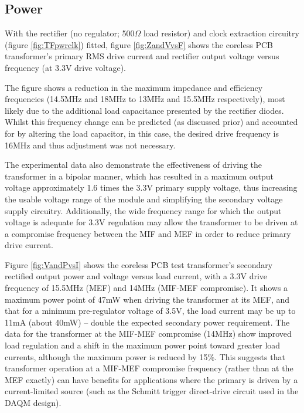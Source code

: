 \documentclass[conference]{IEEEtran}
\begin{document}
	\subsection{Power}
	With the rectifier (no regulator; 500$\Omega$ load resistor) and clock extraction circuitry (figure \ref{fig:TFpwrclk}) fitted, figure \ref{fig:ZandVvsF} shows the coreless PCB transformer's primary RMS drive current and rectifier output voltage versus frequency (at 3.3V drive voltage).
	
	The figure shows a reduction in the maximum impedance and efficiency frequencies (14.5MHz and 18MHz to 13MHz and 15.5MHz respectively), most likely due to the additional load capacitance presented by the rectifier diodes.  Whilst this frequency change can be predicted (as discussed prior) and accounted for by altering the load capacitor, in this case, the desired drive frequency is 16MHz and thus adjustment was not necessary.
	
	The experimental data also demonstrate the effectiveness of driving the transformer in a bipolar manner, which has resulted in a maximum output voltage approximately 1.6 times the 3.3V primary supply voltage, thus increasing the usable voltage range of the module and simplifying the secondary voltage supply circuitry.  Additionally, the wide frequency range for which the output voltage is adequate for 3.3V regulation may allow the transformer to be driven at a compromise frequency between the MIF and MEF in order to reduce primary drive current.
	
	Figure \ref{fig:VandPvsI} shows the coreless PCB test transformer's secondary rectified output power and voltage versus load current, with a 3.3V drive frequency of 15.5MHz (MEF) and 14MHz (MIF-MEF compromise).  It shows a maximum power point of 47mW when driving the transformer at its MEF, and that for a minimum pre-regulator voltage of 3.5V, the load current may be up to 11mA (about 40mW) -- double the expected secondary power requirement.  The data for the transformer at the MIF-MEF compromise (14MHz) show improved load regulation and a shift in the maximum power point toward greater load currents, although the maximum power is reduced by 15\%.  This suggests that transformer operation at a MIF-MEF compromise frequency (rather than at the MEF exactly) can have benefits for applications where the primary is driven by a current-limited source (such as the Schmitt trigger direct-drive circuit used in the DAQM design).
\end{document}
